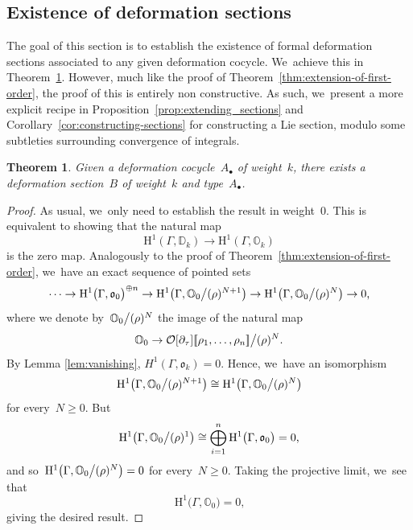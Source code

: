 \documentclass[JEP,XML,SOM,Unicode,published]{cedram}
\let\oldbullet\bullet
\renewcommand{\bullet}{{\scriptscriptstyle\oldbullet}}
\theoremstyle{plain}
\newtheorem{theorem}[theoremcounter]{Theorem}
\theoremstyle{definition}
\newcommand{\tx}{\text}
\newcommand{\bbD}{\ensuremath{\mathbb{D}}}
\newcommand{\bbO}{\ensuremath{\mathbb{O}}}
\newcommand{\cO}{\ensuremath{\mathcal{O}}}
\newcommand{\frako}{\ensuremath{\mathfrak{o}}}
\newcommand{\rmH}{\ensuremath{\mathrm{H}}}
\newcommand{\llbrkt}{[\![}
\newcommand{\rrbrkt}{]\!]}
\let\Ga\Gamma
\begin{document}
\subsection{Existence of deformation sections}
\label{ssec:existence_deformation_section}

The goal of this section is to establish the existence of formal deformation sections associated to any given deformation cocycle. We~achieve this in Theorem~\ref{thm:existence_and_uniqueness_of_section}. However, much like the proof of Theorem~\ref{thm:extension-of-first-order}, the proof of this is entirely non constructive. As such, we~present a more explicit recipe in Proposition~\ref{prop:extending_sections} and Corollary~\ref{cor:constructing-sections} for constructing a Lie section, modulo some subtleties surrounding convergence of integrals.

\begin{theorem}
\label{thm:existence_and_uniqueness_of_section}
Given a deformation cocycle~$A_\bullet$ of weight~$k$, there exists a deformation section~$B$ of weight~$k$ and type~$A_\bullet$.
\end{theorem}

\begin{proof}
As usual, we~only need to establish the result in weight~$0$. This is equivalent to showing that the natural map
\begin{equation*}
\rmH^1(\Ga,\bbD_k)
\to
\rmH^1(\Ga,\bbO_k)
\end{equation*}
is the zero map. Analogously to the proof of Theorem~\ref{thm:extension-of-first-order}, we~have an exact sequence of pointed sets
\begin{equation*}
\cdots \to
\rmH^1\bigl(\Ga, \frako_0\bigr)^{\oplus n}
\to
\rmH^1\bigl(\Ga, \bbO_0\big\slash (\rho)^{N+1} \bigr)
\to
\rmH^1\bigl(\Ga, \bbO_0\big\slash (\rho)^{N} \bigr)
\to
0
\tx{,}
\end{equation*}
where we denote by~$\bbO_0\big\slash (\rho)^N$ the image of the natural map
\begin{equation*}
	\bbO_0
\to
	\cO[\partial_\tau]\llbrkt \rho_1,\ldots,\rho_n\rrbrkt \big\slash (\rho)^N
\tx{.}
\end{equation*}
By Lemma \ref{lem:vanishing}, $H^1(\Ga,\frako_k)=0$. Hence, we~have an isomorphism
\begin{equation*}
\rmH^1\bigl(\Ga, \bbO_0\big\slash (\rho)^{N+1} \bigr)
\cong
\rmH^1\bigl(\Ga, \bbO_0\big\slash (\rho)^{N} \bigr)
\end{equation*}
for every~$N\geq 0$. But
\begin{equation*}
\rmH^1\bigl(\Ga, \bbO_0\big\slash (\rho)^{1} \bigr)
\cong
\bigoplus_{i=1}^n \rmH^1\bigl(\Ga, \frako_0\bigr) = 0
\tx{,}
\end{equation*}
and so~$\rmH^1\bigl(\Ga, \bbO_0\big\slash (\rho)^{N}\bigr)=0$ for every~$N\geq 0$. Taking the projective limit, we~see that
\[
\rmH^1\bigl(\Ga, \bbO_0\bigr)=0\tx{,}\]
giving the desired result.
\end{proof}
\end{document}
